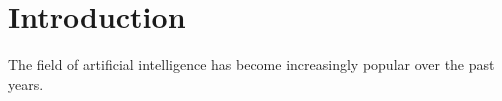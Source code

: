 \section{Introduction}
The field of artificial intelligence has become increasingly popular over the past years.
